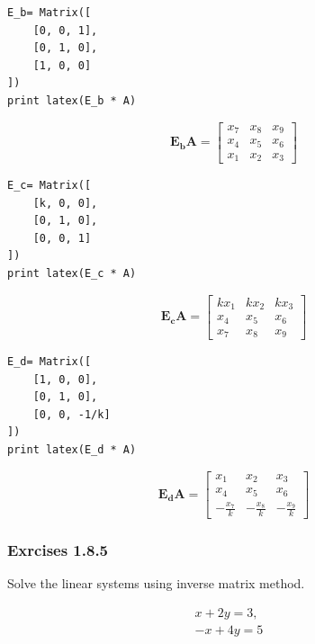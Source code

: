 \begin{verbatim}
E_b= Matrix([
    [0, 0, 1],
    [0, 1, 0],
    [1, 0, 0]
])
print latex(E_b * A)
\end{verbatim}

\begin{equation}\label{eq:}
\mathbf{E_bA} = \left[\begin{matrix}x_{7} & x_{8} & x_{9}\\x_{4} & x_{5} & x_{6}\\x_{1} & x_{2} & x_{3}\end{matrix}\right]
\end{equation}

\begin{verbatim}
E_c= Matrix([
    [k, 0, 0],
    [0, 1, 0],
    [0, 0, 1]
])
print latex(E_c * A)
\end{verbatim}

\begin{equation}\label{eq:}
\mathbf{E_cA} = \left[\begin{matrix}k x_{1} & k x_{2} & k x_{3}\\x_{4} & x_{5} & x_{6}\\x_{7} & x_{8} & x_{9}\end{matrix}\right]
\end{equation}


\begin{verbatim}
E_d= Matrix([
    [1, 0, 0],
    [0, 1, 0],
    [0, 0, -1/k]
])
print latex(E_d * A)
\end{verbatim}

\begin{equation}\label{eq:}
\mathbf{E_dA} = \left[\begin{matrix}x_{1} & x_{2} & x_{3}\\x_{4} & x_{5} & x_{6}\\- \frac{x_{7}}{k} & - \frac{x_{8}}{k} & - \frac{x_{9}}{k}\end{matrix}\right]
\end{equation}

\subsubsection{Exrcises 1.8.5}

Solve the linear systems using inverse matrix method.

\begin{equation}\label{eq:eqs_1_8_5}
\begin{matrix}x + 2 y = 3, & \\ - x + 4 y = 5\end{matrix}
\end{equation}

